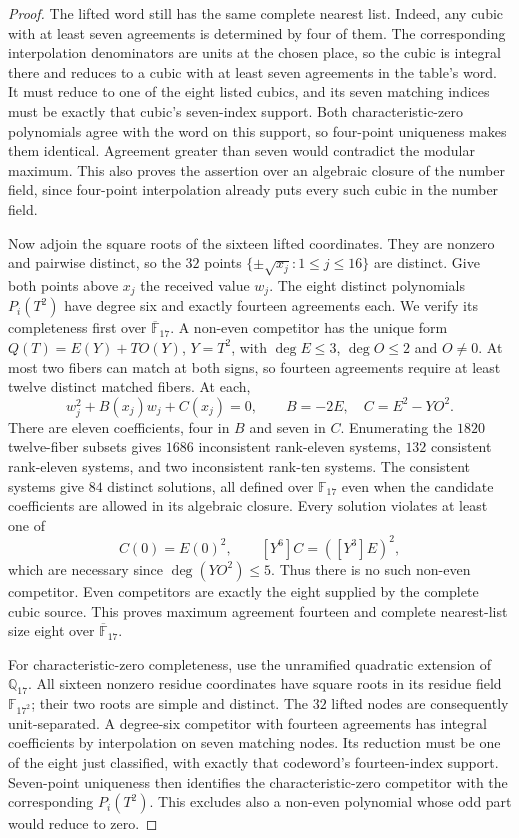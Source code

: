 \begin{proof}
The lifted word still has the same complete nearest list. Indeed, any
cubic with at least seven agreements is determined by four of them.
The corresponding interpolation denominators are units at the chosen
place, so the cubic is integral there and reduces to a cubic with at
least seven agreements in the table's word. It must reduce to one of
the eight listed cubics, and its seven matching indices must be exactly
that cubic's seven-index support. Both characteristic-zero polynomials
agree with the word on this support, so four-point uniqueness makes
them identical. Agreement greater than seven would contradict the
modular maximum. This also proves the assertion over an algebraic
closure of the number field, since four-point interpolation already
puts every such cubic in the number field.

Now adjoin the square roots of the sixteen lifted coordinates. They
are nonzero and pairwise distinct, so the $32$ points
$\{\pm\sqrt{x_j}:1\le j\le16\}$ are distinct. Give both points above
$x_j$ the received value $w_j$. The eight distinct polynomials
$P_i(T^2)$ have degree six and exactly fourteen agreements each.
We verify its completeness first over $\overline{\mathbb F}_{17}$.
A non-even competitor has the unique form
$Q(T)=E(Y)+T O(Y)$, $Y=T^2$, with $\deg E\le3$, $\deg O\le2$ and
$O\ne0$. At most two fibers can match at both signs, so fourteen
agreements require at least twelve distinct matched fibers. At each,
\[
 w_j^2+B(x_j)w_j+C(x_j)=0,\qquad
 B=-2E,\quad C=E^2-YO^2.
\]
There are eleven coefficients, four in $B$ and seven in $C$.
Enumerating the $1820$ twelve-fiber subsets gives $1686$ inconsistent
rank-eleven systems, $132$ consistent rank-eleven systems, and two
inconsistent rank-ten systems. The consistent systems give $84$
distinct solutions, all defined over $\mathbb F_{17}$ even when the
candidate coefficients are allowed in its algebraic closure.
Every solution violates at least one of
\[
 C(0)=E(0)^2,\qquad [Y^6]C=([Y^3]E)^2,
\]
which are necessary since $\deg(YO^2)\le5$. Thus there is no such
non-even competitor. Even competitors are exactly the eight supplied
by the complete cubic source. This proves maximum agreement fourteen
and complete nearest-list size eight over $\overline{\mathbb F}_{17}$.

For characteristic-zero completeness, use the unramified quadratic
extension of $\mathbb Q_{17}$. All sixteen nonzero residue coordinates
have square roots in its residue field $\mathbb F_{17^2}$; their two
roots are simple and distinct. The $32$ lifted nodes are consequently
unit-separated. A degree-six competitor with fourteen agreements has
integral coefficients by interpolation on seven matching nodes. Its
reduction must be one of the eight just classified, with exactly that
codeword's fourteen-index support. Seven-point uniqueness then identifies
the characteristic-zero competitor with the corresponding $P_i(T^2)$.
This excludes also a non-even polynomial whose odd part would reduce
to zero.


\end{proof}
